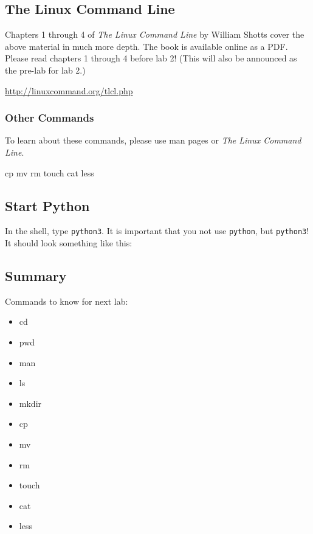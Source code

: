 \documentclass[11pt]{cselabheader}
\begin{document}
\subsection{The Linux Command Line}

Chapters 1 through 4 of \textit{The Linux Command Line} by William Shotts cover
the above material in much more depth. The book is available online as a PDF.
Please read chapters 1 through 4 before lab 2! (This will also be announced as
the pre-lab for lab 2.)
\begin{center}
  \url{http://linuxcommand.org/tlcl.php}
\end{center}

\subsubsection{Other Commands}

To learn about these commands, please use man pages or \textit{The Linux Command
Line}.

\begin{bashcode}
cp
mv
rm
touch
cat
less
\end{bashcode}

\subsection{Start Python}

In the shell, type \texttt{python3}. It is important that you not use
\texttt{python}, but \texttt{python3}! It should look something like this:


\subsection{Summary}
\label{sec:linux.res}

Commands to know for next lab:
\begin{multicols}{3}
\begin{itemize}
  \item cd
  \item pwd
  \item man
  \item ls
  \item mkdir
  \item cp
  \item mv
  \item rm
  \item touch
  \item cat
  \item less
\end{itemize}
\end{multicols}
\end{document}

